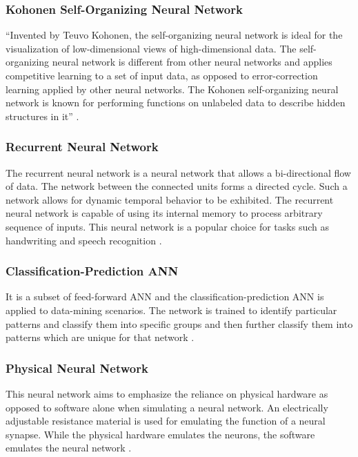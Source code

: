 \subsubsection{Kohonen Self-Organizing Neural Network}

``Invented by Teuvo Kohonen, the self-organizing neural network is ideal for the visualization of low-dimensional views of high-dimensional data. The self-organizing neural network is different from other neural networks and applies competitive learning to a set of input data, as opposed to error-correction learning applied by other neural networks. The Kohonen self-organizing neural network is known for performing functions on unlabeled data to describe hidden structures in it'' \cite{Neuralnet}.

\subsubsection{Recurrent Neural Network}

The recurrent neural network is a neural network that allows a bi-directional flow of data. The network between the connected units forms a directed cycle. Such a network allows for dynamic temporal behavior to be exhibited. The recurrent neural network is capable of using its internal memory to process arbitrary sequence of inputs. This neural network is a popular choice for tasks such as handwriting and speech recognition \cite{Neuralnet}.

\subsubsection{Classification-Prediction ANN}

It is a subset of feed-forward ANN and the classification-prediction ANN is applied to data-mining scenarios. The network is trained to identify particular patterns and classify them into specific groups and then further classify them into patterns which are unique for that network \cite{Neuralnet}.

\subsubsection{Physical Neural Network}

This neural network aims to emphasize the reliance on physical hardware as opposed to software alone when simulating a neural network. An electrically adjustable resistance material is used for emulating the function of a neural synapse. While the physical hardware emulates the neurons, the software emulates the neural network \cite{Neuralnet}.

